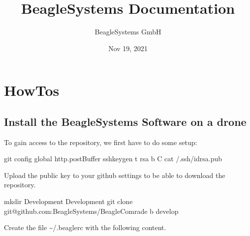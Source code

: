 \documentclass[letterpaper,10pt,english]{sphinxmanual}
\title{BeagleSystems Documentation}
\date{Nov 19, 2021}
\author{BeagleSystems GmbH}
\begin{document}
\pagestyle{empty}
\sphinxmaketitle
\pagestyle{plain}
\sphinxtableofcontents
\pagestyle{normal}
\label{\detokenize{index::doc}}



\chapter{HowTos}
\label{\detokenize{source/howtos:howtos}}\label{\detokenize{source/howtos::doc}}

\section{Install the BeagleSystems Software on a drone}
\label{\detokenize{source/howtos/install:install-the-beaglesystems-software-on-a-drone}}\label{\detokenize{source/howtos/install::doc}}
To gain access to the repository, we first have to do some setup:

\begin{sphinxVerbatim}[commandchars=\\\{\}]
\PYGZdl{} git config \PYGZhy{}\PYGZhy{}global http.postBuffer 
\PYGZdl{} ssh\PYGZhy{}keygen \PYGZhy{}t rsa \PYGZhy{}b  \PYGZhy{}C 
\PYGZdl{} cat \PYGZti{}/.ssh/id\PYGZus{}rsa.pub
\end{sphinxVerbatim}

Upload the public key to your github settings to be able to download the repository.

\begin{sphinxVerbatim}[commandchars=\\\{\}]
\PYGZdl{} mkdir Development
\PYGZdl{}  Development
\PYGZdl{} git clone git@github.com:BeagleSystems/BeagleComrade \PYGZhy{}b develop
\end{sphinxVerbatim}

Create the file \textasciitilde{}/.beaglerc with the following content.
\end{document}
